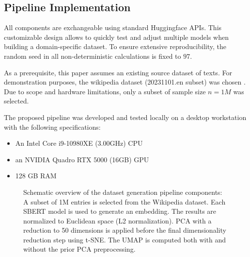 \subsection{Pipeline Implementation}
\label{subsec:pipeline}

All components are exchangeable using standard Huggingface APIs. This customizable design allows to quickly test and adjust multiple models when building a domain-specific dataset. To ensure extensive reproducibility, the random seed in all non-deterministic calculations is fixed to $97$.

As a prerequisite, this paper assumes an existing source dataset of texts. For demonstration purposes, the wikipedia dataset (20231101.en subset) was chosen \cite{WikimediaWikipediaDatasets2025}. Due to scope and hardware limitations, only a subset of sample size $n = 1M$ was selected.

The proposed pipeline was developed and tested locally on a desktop workstation with the following specifications:

\begin{itemize}
    \item An Intel Core i9-10980XE (3.00GHz) CPU
    \item an NVIDIA Quadro RTX 5000 (16GB) GPU
    \item 128 GB RAM
\end{itemize}

\begin{figure}[htb]
    \centering
    \caption{Schematic overview of the dataset generation pipeline components: A subset of 1M entries is selected from the Wikipedia dataset. Each SBERT model is used to generate an embedding. The results are normalized to Euclidean space (L2 normalization). PCA with a reduction to 50 dimensions is applied before the final dimensionality reduction step using t-SNE. The UMAP is computed both with and without the prior PCA preprocessing.}
    \label{fig:pipeline-overview}
\end{figure}

